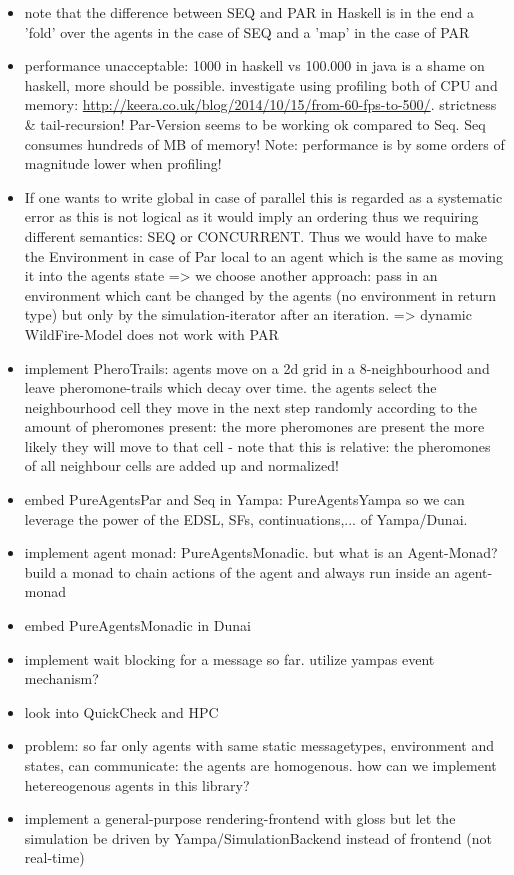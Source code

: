 \begin{itemize}
\item note that the difference between SEQ and PAR in Haskell is in the end a 'fold' over the agents in the case of SEQ and a 'map' in the case of PAR
\item performance unacceptable: 1000 in haskell vs 100.000 in java is a shame on haskell, more should be possible. investigate using profiling both of CPU and memory: \url{http://keera.co.uk/blog/2014/10/15/from-60-fps-to-500/}. strictness \& tail-recursion!
	Par-Version seems to be working ok compared to Seq. Seq consumes hundreds of MB of memory!
	Note: performance is by some orders of magnitude lower when profiling!

\item If one wants to write global in case of parallel this is regarded as a systematic error as this is not logical as it would imply an ordering thus we requiring different semantics: SEQ or CONCURRENT. Thus we would have to make the Environment in case of Par local to an agent which is the same as moving it into the agents state => we choose another approach: pass in an environment which cant be changed by the agents (no environment in return type) but only by the simulation-iterator after an iteration.  => dynamic WildFire-Model does not work with PAR

\item implement PheroTrails: agents move on a 2d grid in a 8-neighbourhood and leave pheromone-trails which decay over time. the agents select the neighbourhood cell they move in the next step randomly according to the amount of pheromones present: the more pheromones are present the more likely they will move to that cell - note that this is relative: the pheromones of all neighbour cells are added up and normalized!


\item embed PureAgentsPar and Seq in Yampa: PureAgentsYampa so we can leverage the power of the EDSL, SFs, continuations,... of Yampa/Dunai.
\item implement agent monad: PureAgentsMonadic. but what is an Agent-Monad? build a monad to chain actions of the agent and always run inside an agent-monad
\item embed PureAgentsMonadic in Dunai

\item implement wait blocking for a message so far. utilize yampas event mechanism?

\item look into QuickCheck and HPC
\item problem: so far only agents with same static messagetypes, environment and states, can communicate: the agents are homogenous. how can we implement hetereogenous agents in this library?
\item implement a general-purpose rendering-frontend with gloss but let the simulation be driven by Yampa/SimulationBackend instead of frontend (not real-time)



\end{itemize}
